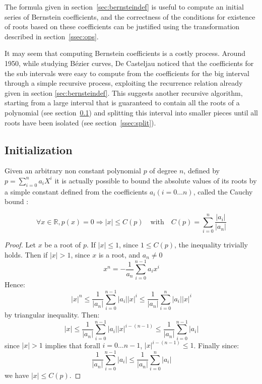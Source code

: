 \documentclass{mscs}
\begin{document}
The formula given in section~\ref{sec:bernsteindef} is useful to compute an
initial series of Bernstein coefficients, and the correctness of the
conditions for existence of roots based on these coefficients can be
justified using the transformation described in
section~\ref{ssec:ops}.

It may seem that computing Bernstein coefficients is a costly process.
Around 1950, while studying B\'ezier curves, De Casteljau noticed that
the coefficients for the sub intervals
were easy to compute from the coefficients for the big interval
through a simple recursive process, exploiting the recurrence relation
already given in section \ref{sec:bernsteindef}.  This suggests
another recursive algorithm, starting from a large interval that is
guaranteed to contain all the roots of a polynomial (see section~\ref{ssec:cauchy}) and splitting this
interval into smaller pieces until all roots have been isolated (see section~\ref{ssec:split}).

\subsection{Initialization}\label{ssec:cauchy}
Given an arbitrary non constant polynomial $p$ of degree
$n$, defined by $p = \sum_{i  = 0}^n a_iX^i$ it is actually  possible to bound the absolute values
of its roots by a simple constant defined from the coefficients
$a_i ({i = 0 \dots n})$, called the Cauchy bound \cite{bpr}:
\begin{theorem}
$$\forall x \in \mathbb{R}, p(x) = 0 \Rightarrow |x|
\leq C(p) \quad \textrm{with} \quad C(p) = \sum_{i=0}^n \frac{|a_i|}{|a_n|}$$
\end{theorem}
\begin{proof}
Let $x$ be a root of $p$. If $|x|\leq 1$, since $1 \leq C(p)$,
the inequality trivially holds. Then if $|x| > 1$, since $x$ is a root,
and $a_n \neq 0$
$$x^n = - \frac{1}{a_n}\sum_{i = 0}^{n-1}a_i x^i$$
Hence:
$$|x|^n \leq \frac{1}{|a_n|}\sum_{i = 0}^{n-1}|a_i| |x|^i \leq
\frac{1}{|a_n|}\sum_{i = 0}^{n}|a_i| |x|^i$$
by triangular inequality. Then:
$$|x| \leq \frac{1}{|a_n|}\sum_{i = 0}^{n-1}|a_i| |x|^{i - (n - 1)} \leq
\frac{1}{|a_n|}\sum_{i = 0}^{n-1}|a_i| $$
since $|x| > 1$ implies that forall $i = 0 \dots n-1$,
$|x|^{i - (n - 1)} \leq 1$. Finally since:
$$\frac{1}{|a_n|}\sum_{i = 0}^{n-1}|a_i| \leq \frac{1}{|a_n|}\sum_{i =
  0}^{n}|a_i|$$
we have $|x| \leq C(p)$.
\end{proof}

\end{document}
